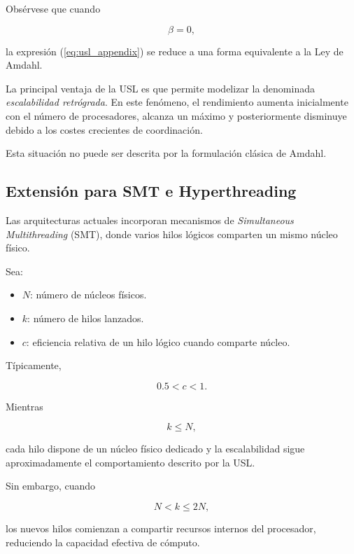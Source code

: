 \documentclass[11pt]{article}
\begin{document}
Obsérvese que cuando

\begin{equation}
\beta = 0,
\end{equation}

la expresión (\ref{eq:usl_appendix}) se reduce a una forma equivalente a la Ley de Amdahl.

La principal ventaja de la USL es que permite modelizar la denominada \emph{escalabilidad retrógrada}. En este fenómeno, el rendimiento aumenta inicialmente con el número de procesadores, alcanza un máximo y posteriormente disminuye debido a los costes crecientes de coordinación.

Esta situación no puede ser descrita por la formulación clásica de Amdahl.

\subsection{Extensión para SMT e Hyperthreading}

Las arquitecturas actuales incorporan mecanismos de \emph{Simultaneous Multithreading} (SMT), donde varios hilos lógicos comparten un mismo núcleo físico.

Sea:

\begin{itemize}
\item \(N\): número de núcleos físicos.
\item \(k\): número de hilos lanzados.
\item \(c\): eficiencia relativa de un hilo lógico cuando comparte núcleo.
\end{itemize}

Típicamente,

\begin{equation}
0.5 < c < 1.
\end{equation}

Mientras

\begin{equation}
k \leq N,
\end{equation}

cada hilo dispone de un núcleo físico dedicado y la escalabilidad sigue aproximadamente el comportamiento descrito por la USL.

Sin embargo, cuando

\begin{equation}
N < k \leq 2N,
\end{equation}

los nuevos hilos comienzan a compartir recursos internos del procesador, reduciendo la capacidad efectiva de cómputo.
\end{document}
